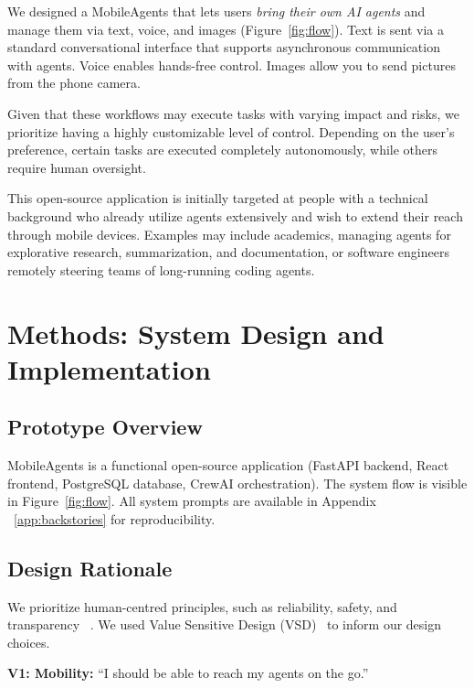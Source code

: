 \documentclass[sigconf, anonymous]{acmart}
\begin{document}
We designed a MobileAgents that lets users \emph{bring their own AI agents} and manage them via text, voice, and images (Figure~\ref{fig:flow}). Text is sent via a standard conversational interface that supports asynchronous communication with agents. Voice enables hands-free control. Images allow you to send pictures from the phone camera.

Given that these workflows may execute tasks with varying impact and risks, we prioritize having a highly customizable level of control. Depending on the user’s preference, certain tasks are executed completely autonomously, while others require human oversight.

This open-source application is initially targeted at people with a technical background who already utilize agents extensively and wish to extend their reach through mobile devices. Examples may include academics, managing agents for explorative research, summarization, and documentation, or software engineers remotely steering teams of long-running coding agents.

\section{Methods: System Design and Implementation}

\subsection{Prototype Overview}


MobileAgents is a functional open-source application (FastAPI backend, React frontend, PostgreSQL database, CrewAI orchestration). The system flow is visible in Figure~\ref{fig:flow}. All system prompts are available in Appendix ~\ref{app:backstories} for reproducibility.


\subsection{Design Rationale}

We prioritize human-centred principles, such as reliability, safety, and transparency ~\cite{Shneiderman2020}. We used Value Sensitive Design (VSD)~\cite{Friedman2002} to inform our design choices.

\textbf{V1: Mobility:} ``I should be able to reach my agents on the go.''
\end{document}
